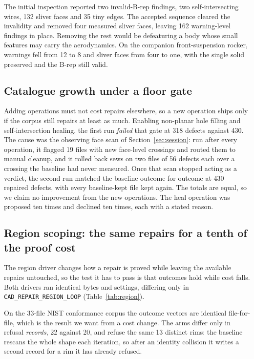\documentclass[10pt,onecolumn]{article}
\newcommand{\code}[1]{\texttt{\small #1}}
\begin{document}
The initial inspection reported two invalid-B-rep findings, two self-intersecting wires, 132 sliver
faces and 35 tiny edges. The accepted sequence cleared the invalidity and removed four measured
sliver faces, leaving 162 warning-level findings in place. Removing the rest would be defeaturing a
body whose small features may carry the aerodynamics. On the companion front-suspension rocker,
warnings fell from 12 to 8 and sliver faces from four to one, with the single solid preserved and
the B-rep still valid.

\subsection{Catalogue growth under a floor gate}\label{sec:floorgate}

Adding operations must not cost repairs elsewhere, so a new operation ships only if the corpus still
repairs at least as much. Enabling non-planar hole filling and self-intersection healing, the first
run \emph{failed} that gate at 318 defects against 430. The cause was the observing face scan of
Section~\ref{sec:session}: run after every operation, it flagged 19 files with new face-level
crossings and routed them to manual cleanup, and it rolled back sews on two files of 56 defects each
over a crossing the baseline had never measured. Once that scan stopped acting as a verdict, the
second run matched the baseline outcome for outcome at 430 repaired defects, with every
baseline-kept file kept again. The totals are equal, so we claim no improvement from the new
operations. The heal operation was proposed ten times and declined ten times, each with a stated
reason.

\subsection{Region scoping: the same repairs for a tenth of the proof cost}

The region driver changes how a repair is proved while leaving the available repairs untouched, so
the test it has to pass is that outcomes hold while cost falls. Both drivers ran identical bytes and
settings, differing only in \code{CAD\_REPAIR\_REGION\_LOOP} (Table~\ref{tab:region}).

On the 33-file NIST conformance corpus the outcome vectors are identical file-for-file, which is the
result we want from a cost change. The arms differ only in refusal \emph{records}, 22 against 20,
and refuse the same 13 distinct rims: the baseline rescans the whole shape each iteration, so after
an identity collision it writes a second record for a rim it has already refused.
\end{document}
